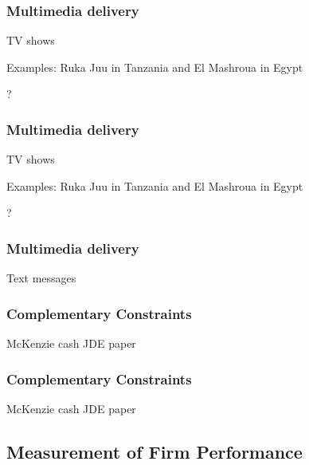 \documentclass[hideothersubsections, usenames,dvipsnames,11pt]{beamer}
\newenvironment{itemize_2pt}{\itemize\addtolength{\itemsep}{2pt}}{\enditemize}
\begin{document}

\begin{frame}
\frametitle{Multimedia delivery}
	TV shows
	\begin{itemize_2pt}
	\item Examples: Ruka Juu in Tanzania \citep{Bjorvatn2020} and El Mashroua in Egypt \citep{Barsoum2018}
	\item ?
	\vspace{0.1in}
	\end{itemize_2pt}
\end{frame}

\begin{frame}
\frametitle{Multimedia delivery}
	TV shows
	\begin{itemize_2pt}
	\item Examples: Ruka Juu in Tanzania \citep{Bjorvatn2020} and El Mashroua in Egypt \citep{Barsoum2018}
	\item ?
	\vspace{0.1in}
	\end{itemize_2pt}
\end{frame}

\begin{frame}
\frametitle{Multimedia delivery}
	Text messages
	\begin{itemize_2pt}
	\item \citep{Cole2019} \citep{Acimovic2020}
	\vspace{0.1in}
	\end{itemize_2pt}
\end{frame}


\begin{frame}
\frametitle{Complementary Constraints}
	\begin{itemize_2pt}
	\item McKenzie cash JDE paper
	\vspace{0.1in}
	\end{itemize_2pt}
\end{frame}

\begin{frame}
\frametitle{Complementary Constraints}
	\begin{itemize_2pt}
	\item McKenzie cash JDE paper
	\vspace{0.1in}
	\end{itemize_2pt}
\end{frame}


\subsection{Measurement of Firm Performance}
\end{document}
